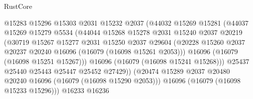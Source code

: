 \begin{lexlean}{RustCore}
\begin{coremodule}
                                  @15283
                                  @15296
                                  @15303
                                  @2031
                                  @15232
                                  @2037
                                  (@44032
                                    @15269
                                    @15281
                                    (@44037
                                      @15269
                                      @15279
                                      @5534
                                      (@44044
                                        @15268
                                        @15278
                                        @2031
                                        @15240
                                        @2037
                                        @20219
                                        (@30719
                                          @15267
                                          @15277
                                          @2031
                                          @15250
                                          @2037
                                          @29604
                                          (@20228
                                            @15260
                                            @2037
                                            @20237
                                            @20240
                                            @16096
                                            (@16079 (@16098 @15261 @2053)))
                                          @16096
                                          (@16079 (@16098 @15251 @15267)))
                                        @16096
                                        (@16079 (@16098 @15241 @15268)))
                                      @25437
                                      @25440
                                      @25443
                                      @25447
                                      @25452
                                      @27429))
                                  (@20474
                                    @15289
                                    @2037
                                    @20480
                                    @20240
                                    @16096
                                    (@16079 (@16098 @15290 @2053)))
                                  @16096
                                  (@16079 (@16098 @15233 @15296)))
                                @16233
                                @16236

\end{coremodule}
\end{lexlean}
